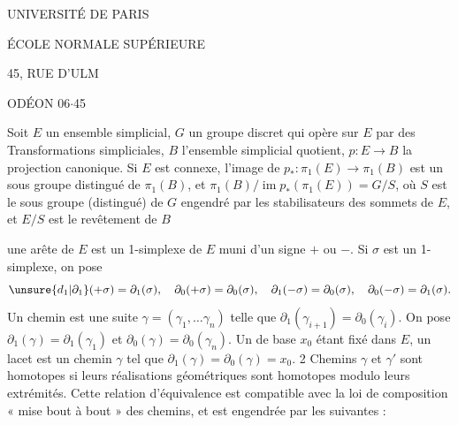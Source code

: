 \begin{center}
UNIVERSITÉ DE PARIS


ÉCOLE NORMALE SUPÉRIEURE


45, RUE D'ULM

ODÉON 06$\cdot$45

\end{center}

Soit $E$ un ensemble simplicial,  $G$ un groupe discret qui opère sur $E$ par des Transformations simpliciales, $B$ l'ensemble simplicial quotient,  $p:E\to B$ la projection canonique. Si $E$ est connexe, l'image de $p_*:\pi_1(E)\to\pi_1(B)$ est un sous groupe distingué de $\pi_1(B)$, et $\pi_1(B)/\operatorname{im}p_*(\pi_1(E))=G/S$, où $S$ est le sous groupe (distingué) de $G$ engendré par les stabilisateurs des sommets de $E$, et $E/S$ est le revêtement  de $B$ 


 une arête de $E$ est un 1-simplexe de $E$ muni d'un signe $+$ ou $-$. Si $\sigma$ est un 1-simplexe, on pose
\[
\unsure{d_1|\partial_1}(+\sigma)=\partial_1(\sigma),\quad
\partial_0(+\sigma)=\partial_0(\sigma),\quad
\partial_1(-\sigma)=\partial_0(\sigma),\quad
\partial_0(-\sigma)=\partial_1(\sigma).
\]
Un chemin est une suite $\gamma=(\gamma_1,\ldots\gamma_n)$ telle que $\partial_1(\gamma_{i+1})=\partial_0(\gamma_i)$. On pose $\partial_1(\gamma)=\partial_1(\gamma_1)$ et $\partial_0(\gamma)=\partial_0(\gamma_n)$. Un  de base $x_0$ étant fixé dans $E$, un lacet est un chemin $\gamma$ tel que $\partial_1(\gamma)=\partial_0(\gamma)=x_0$. 2 Chemins $\gamma$ et $\gamma'$ sont homotopes si leurs réalisations géométriques sont homotopes modulo leurs extrémités. Cette relation d'équivalence est compatible avec la loi de composition « mise bout à bout » des chemins, et est engendrée par les suivantes :


